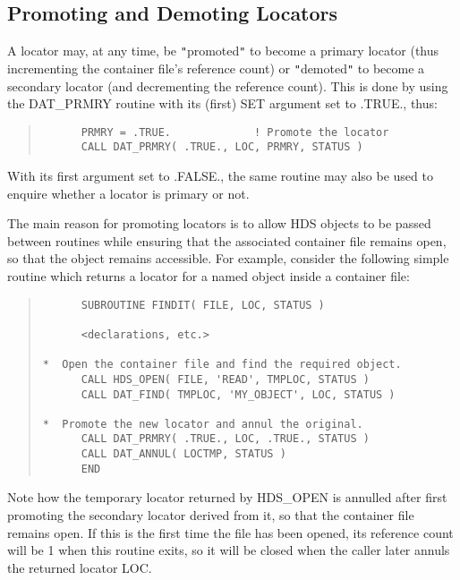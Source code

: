 \documentclass[11pt]{article}
\newcommand{\htmlref}[2]{#1}
\newcommand{\xlabel}[1]{}
\newcommand{\qt}[1]{``#1''}
\renewcommand{\qt}[1]{{\tt{"}}#1{\tt{"}}}
\begin{document}
\subsection{\xlabel{promoting_and_demoting_locators}\label{sect:promote}Promoting and Demoting Locators}

A locator may, at any time, be \qt{promoted} to become a
\htmlref{primary}{sect:primary} locator (thus incrementing the
container file's \htmlref{reference count}{sect:refct}) or
\qt{demoted} to become a secondary locator (and decrementing the
reference count). This is done by using the
\htmlref{DAT\_PRMRY}{DAT_PRMRY} routine with its (first) SET argument
set to .TRUE., thus:

\small
\begin{quote}
\begin{verbatim}
      PRMRY = .TRUE.             ! Promote the locator
      CALL DAT_PRMRY( .TRUE., LOC, PRMRY, STATUS )
\end{verbatim}
\end{quote}
\normalsize

With its first argument set to .FALSE., the same routine may also be
used to enquire whether a locator is primary or not.

The main reason for promoting locators is to allow HDS objects to be
passed between routines while ensuring that the associated container
file remains open, so that the object remains accessible. For example,
consider the following simple routine which returns a locator for a
named object inside a container file:

\small
\begin{quote}
\begin{verbatim}
      SUBROUTINE FINDIT( FILE, LOC, STATUS )

      <declarations, etc.>

*  Open the container file and find the required object.
      CALL HDS_OPEN( FILE, 'READ', TMPLOC, STATUS )
      CALL DAT_FIND( TMPLOC, 'MY_OBJECT', LOC, STATUS )

*  Promote the new locator and annul the original.
      CALL DAT_PRMRY( .TRUE., LOC, .TRUE., STATUS )
      CALL DAT_ANNUL( LOCTMP, STATUS )
      END
\end{verbatim}
\end{quote}
\normalsize

Note how the temporary locator returned by
\htmlref{HDS\_OPEN}{HDS_OPEN} is \htmlref{annulled}{sect:annul} after
first promoting the secondary locator derived from it, so that the
container file remains open. If this is the first time the file has
been opened, its reference count will be 1 when this routine exits, so
it will be closed when the caller later annuls the returned locator
LOC.
\end{document}
